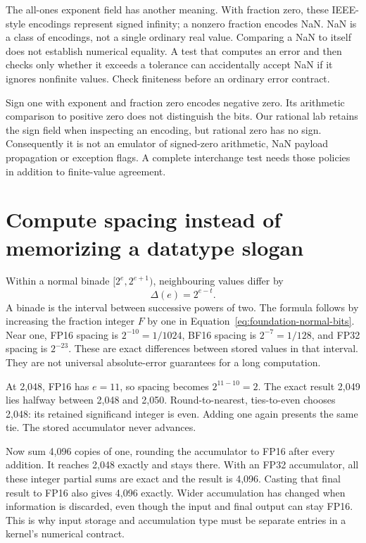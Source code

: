 The all-ones exponent field has another meaning. With fraction zero,
these IEEE-style encodings represent signed infinity; a nonzero
fraction encodes NaN. NaN is a class of encodings, not a single ordinary
real value. Comparing a NaN to itself does not establish numerical
equality. A test that computes an error and then checks only whether
it exceeds a tolerance can accidentally accept NaN if it ignores
nonfinite values. Check finiteness before an ordinary error contract.

Sign one with exponent and fraction zero encodes negative zero.
Its arithmetic comparison to positive zero does not distinguish the
bits. Our rational lab retains the sign field when inspecting an
encoding, but rational zero has no sign. Consequently it is not an
emulator of signed-zero arithmetic, NaN payload propagation or
exception flags. A complete interchange test needs those policies
in addition to finite-value agreement.

\section{Compute spacing instead of memorizing a datatype slogan}
Within a normal binade $[2^e,2^{e+1})$, neighbouring values differ by
\[
 \Delta(e)=2^{e-t}.
\]
A binade is the interval between successive powers of two. The
formula follows by increasing the fraction integer $F$ by one
in Equation~\ref{eq:foundation-normal-bits}. Near one, FP16 spacing
is $2^{-10}=1/1024$, BF16 spacing is $2^{-7}=1/128$, and FP32
spacing is $2^{-23}$. These are exact differences between stored
values in that interval. They are not universal absolute-error
guarantees for a long computation.

At 2,048, FP16 has $e=11$, so spacing becomes $2^{11-10}=2$.
The exact result 2,049 lies halfway between 2,048 and 2,050.
Round-to-nearest, ties-to-even chooses 2,048: its retained
significand integer is even. Adding one again presents the same tie.
The stored accumulator never advances.

Now sum 4,096 copies of one, rounding the accumulator to FP16
after every addition. It reaches 2,048 exactly and stays there.
With an FP32 accumulator, all these integer partial sums are exact
and the result is 4,096. Casting that final result to FP16 also
gives 4,096 exactly. Wider accumulation has changed when information
is discarded, even though the input and final output can stay FP16.
This is why input storage and accumulation type must be separate
entries in a kernel's numerical contract.

